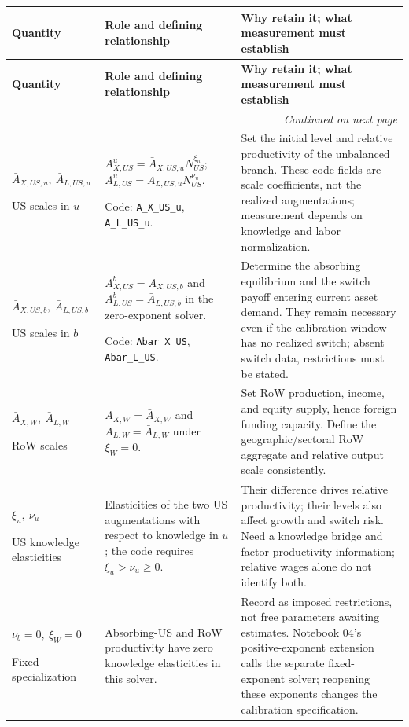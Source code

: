 \documentclass[10pt,a4paper,landscape]{article}
\makeatletter
\newcommand{\code}[1]{{\footnotesize\texttt{#1}}}
\newenvironment{coretable}{%
\begin{longtable}{@{}P{\dimexpr .19\textwidth-3.8pt\relax}P{\dimexpr .35\textwidth-7pt\relax}P{\dimexpr .46\textwidth-9.2pt\relax}@{}}
\toprule
\rowcolor{tablehead}\textbf{Quantity} & \textbf{Role and defining relationship} & \textbf{Why retain it; what measurement must establish}\\
\midrule
\endfirsthead
\toprule
\rowcolor{tablehead}\textbf{Quantity} & \textbf{Role and defining relationship} & \textbf{Why retain it; what measurement must establish}\\
\midrule
\endhead
\midrule\multicolumn{3}{r}{\footnotesize\itshape Continued on next page}\\
\endfoot
\bottomrule
\endlastfoot
}{\end{longtable}}
\makeatother
\begin{document}
\begin{coretable}
$\bar A_{X,US,u},\ \bar A_{L,US,u}$\par US scales in $u$ & $A^u_{X,US}=\bar A_{X,US,u}N_{US}^{\xi_u}$; $A^u_{L,US}=\bar A_{L,US,u}N_{US}^{\nu_u}$.\par Code: \code{A\_X\_US\_u}, \code{A\_L\_US\_u}. & Set the initial level and relative productivity of the unbalanced branch. These code fields are scale coefficients, not the realized augmentations; measurement depends on knowledge and labor normalization.\\[4pt]
$\bar A_{X,US,b},\ \bar A_{L,US,b}$\par US scales in $b$ & $A^b_{X,US}=\bar A_{X,US,b}$ and $A^b_{L,US}=\bar A_{L,US,b}$ in the zero-exponent solver.\par Code: \code{Abar\_X\_US}, \code{Abar\_L\_US}. & Determine the absorbing equilibrium and the switch payoff entering current asset demand. They remain necessary even if the calibration window has no realized switch; absent switch data, restrictions must be stated.\\[4pt]
$\bar A_{X,W},\ \bar A_{L,W}$\par RoW scales & $A_{X,W}=\bar A_{X,W}$ and $A_{L,W}=\bar A_{L,W}$ under $\xi_W=0$. & Set RoW production, income, and equity supply, hence foreign funding capacity. Define the geographic/sectoral RoW aggregate and relative output scale consistently.\\[4pt]
$\xi_u,\ \nu_u$\par US knowledge elasticities & Elasticities of the two US augmentations with respect to knowledge in $u$; the code requires $\xi_u>\nu_u\ge0$. & Their difference drives relative productivity; their levels also affect growth and switch risk. Need a knowledge bridge and factor-productivity information; relative wages alone do not identify both.\\[4pt]
$\nu_b=0,\ \xi_W=0$\par Fixed specialization & Absorbing-US and RoW productivity have zero knowledge elasticities in this solver. & Record as imposed restrictions, not free parameters awaiting estimates. Notebook 04's positive-exponent extension calls the separate fixed-exponent solver; reopening these exponents changes the calibration specification.\\[4pt]
\end{coretable}

\clearpage
\end{document}
